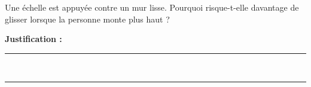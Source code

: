 Une échelle est appuyée contre un mur lisse. Pourquoi risque-t-elle davantage de glisser lorsque la personne monte plus haut ?

\choices

\noindent\textbf{Justification :} \hrulefill \\[2.5ex]
\rule{\linewidth}{0.4pt} \\[2.5ex]
\rule{\linewidth}{0.4pt}
\vfill
